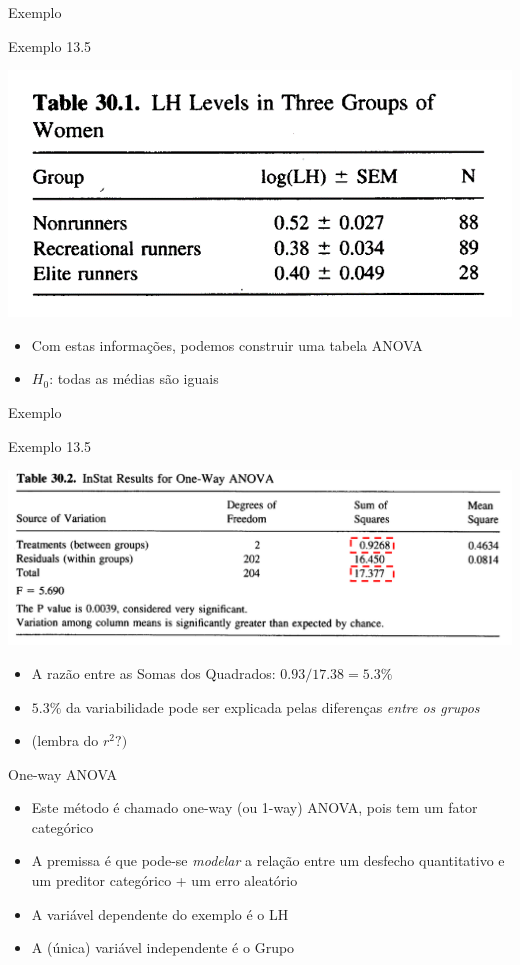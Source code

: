 \documentclass{beamer}
\begin{document}
\begin{frame}{Exemplo}
  \begin{exampleblock}{Exemplo 13.5}
    \begin{center}
      \includegraphics[width=.6\textwidth]{Cap13-30/exemplo13_5-1}
    \end{center}
  \begin{itemize}
  \item Com estas informações, podemos construir uma tabela ANOVA
  \item $H_0$: todas as médias são iguais
  \end{itemize}
  \end{exampleblock}
\end{frame}

\begin{frame}{Exemplo}
  \begin{exampleblock}{Exemplo 13.5}
    \begin{center}
      \includegraphics[width=.6\textwidth]{Cap13-30/exemplo13_5-2}
    \end{center}
  \begin{itemize}
  \item A razão entre as Somas dos Quadrados: $0.93/17.38 = 5.3\%$
  \item $5.3\%$ da variabilidade pode ser explicada pelas diferenças {\em entre os grupos}
  \item (lembra do $r^2?)$
  \end{itemize}
  \end{exampleblock}
\end{frame}

\begin{frame}{One-way ANOVA}
  \begin{itemize}
  \item Este método é chamado one-way (ou 1-way) ANOVA, pois tem um fator categórico
  \item A premissa é que pode-se {\em modelar} a relação entre um desfecho quantitativo e um preditor categórico + um erro aleatório
  \item A variável dependente do exemplo é o LH
  \item A (única) variável independente é o Grupo
  \end{itemize}
\end{frame}
\end{document}
